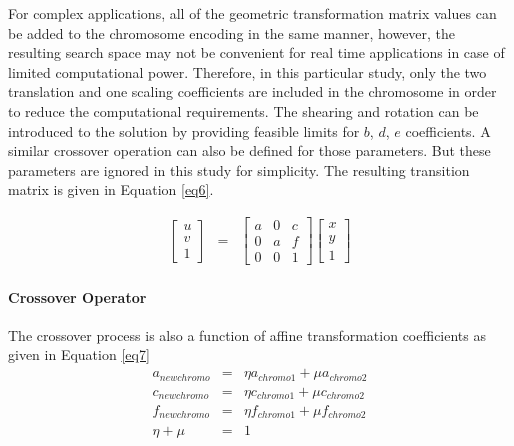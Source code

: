 \documentclass[review,number]{elsarticle}
\begin{document}
For complex applications, all of the geometric transformation matrix values can be added to the chromosome encoding in the same manner, however, the resulting search space may not be convenient for real time applications in case of limited computational power. Therefore, in this particular study, only the two translation and one scaling coefficients are included in the chromosome in order to reduce the computational requirements. The shearing and rotation can be introduced to the solution by providing feasible limits for $b$, $d$, $e$ coefficients. A similar crossover operation can also be defined for those parameters. But these parameters are ignored in this study for simplicity. The resulting transition matrix is given in Equation \ref{eq6}.

\begin{eqnarray}
\label{eq6}
\begin{bmatrix}
  u\\
  v\\
  1
\end{bmatrix}
&=&
\begin{bmatrix}
  a & 0 & c\\
  0 & a & f\\
  0 & 0 & 1
\end{bmatrix}
\begin{bmatrix}
  x\\
  y\\
  1
\end{bmatrix}
\end{eqnarray}

\paragraph{Crossover Operator}
The crossover process is also a function of affine transformation coefficients as given in Equation \ref{eq7}
\begin{eqnarray}
\label{eq7}
\nonumber a_{newchromo}&=&\eta a_{chromo1}+\mu a_{chromo2} \\
c_{newchromo}&=&\eta c_{chromo1}+\mu c_{chromo2} \\
\nonumber f_{newchromo}&=&\eta f_{chromo1}+\mu f_{chromo2} \\
\nonumber  \eta+\mu &=& 1
\end{eqnarray}
\par
\end{document}

